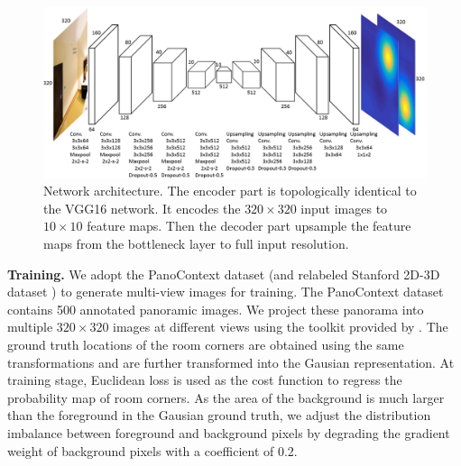 \begin{figure}
	\centering
	\includegraphics[width=\linewidth]{figs/network.png}
	\caption{Network architecture. The encoder part is topologically identical to the VGG16 network. It encodes the $320 \times 320$ input images to $10 \times 10$ feature maps. Then the decoder part upsample the feature maps from the bottleneck layer to full input resolution. }
	\label{fig:network}
\end{figure}

\noindent\textbf{Training.} 
We adopt the PanoContext dataset \cite{zhang2014panocontext} (and relabeled Stanford 2D-3D dataset \cite{layoutnet}) to generate multi-view images for training. The PanoContext dataset contains 500 annotated panoramic images. We project these panorama into multiple $320 \times 320$ images at different views using the toolkit provided by \cite{zhang2014panocontext}. The ground truth locations of the room corners are obtained using the same transformations and are further transformed into the Gausian representation. At training stage, Euclidean loss is used as the cost function to regress the probability map of room corners. As the area of the background is much larger than the foreground in the Gausian ground truth, we adjust the distribution imbalance between foreground and background pixels by degrading the gradient weight of background pixels with a coefficient of 0.2.



